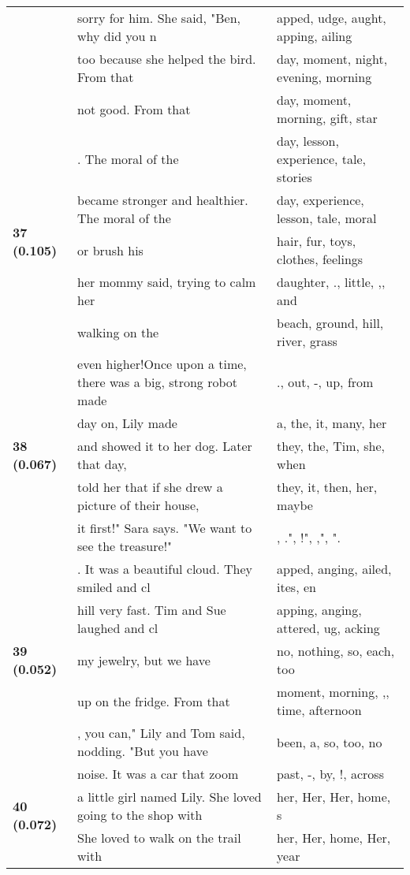 \documentclass{article}
\begin{document}
\begin{adjustbox}{max width=\textwidth}
\begin{tabular}{p{} p{} p{}}
 & sorry for him. She said, "Ben, why did you n & apped, udge, aught, apping, ailing \\
 & too because she helped the bird. From that & day,  moment,  night,  evening,  morning \\
 & not good. From that & day,  moment,  morning,  gift,  star \\
\midrule
\multirow{5}{*}{\textbf{37 (0.105)}} & .  The moral of the & day,  lesson,  experience,  tale,  stories \\
 & became stronger and healthier.  The moral of the & day,  experience,  lesson,  tale,  moral \\
 & or brush his & hair,  fur,  toys,  clothes,  feelings \\
 & her mommy said, trying to calm her & daughter, .,  little, ,,  and \\
 & walking on the & beach,  ground,  hill,  river,  grass \\
\midrule
\multirow{5}{*}{\textbf{38 (0.067)}} & even higher!Once upon a time, there was a big, strong robot made & .,  out, -,  up,  from \\
 & day on, Lily made & a,  the,  it,  many,  her \\
 & and showed it to her dog.   Later that day, & they,  the,  Tim,  she,  when \\
 & told her that if she drew a picture of their house, & they,  it,  then,  her,  maybe \\
 & it first!" Sara says. "We want to see the treasure!" & , .", !", ,", ". \\
\midrule
\multirow{5}{*}{\textbf{39 (0.052)}} & . It was a beautiful cloud. They smiled and cl & apped, anging, ailed, ites, en \\
 & hill very fast. Tim and Sue laughed and cl & apping, anging, attered, ug, acking \\
 & my jewelry, but we have & no,  nothing,  so,  each,  too \\
 & up on the fridge. From that & moment,  morning, ,,  time,  afternoon \\
 & , you can," Lily and Tom said, nodding. "But you have & been,  a,  so,  too,  no \\
\midrule
\multirow{5}{*}{\textbf{40 (0.072)}} & noise. It was a car that zoom & past, -,  by, !,  across \\
 & a little girl named Lily. She loved going to the shop with & her,  Her, Her,  home, s \\
 & She loved to walk on the trail with & her,  Her,  home, Her, year \\

\end{tabular}
\end{adjustbox}
\end{document}
